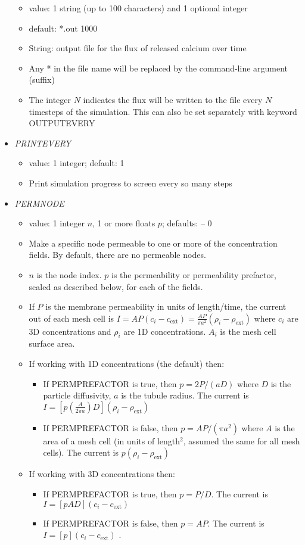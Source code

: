 \documentclass[12pt]{article}
\begin{document}
\begin{itemize}
\begin{itemize}
      \item  value: 1 string (up to 100 characters) and 1 optional integer
      \item  default: *.out 1000
      \item String: output file for the flux of released calcium over time      
      \item Any * in the file name will be replaced by the command-line argument (suffix)
      \item The integer $N$ indicates the flux will be written to the file every $N$ timesteps of the simulation. This can also be set separately with keyword OUTPUTEVERY
      \end{itemize}
%
\item {\it PRINTEVERY}
\begin{itemize}
	\item  value: 1 integer; default: 1
	\item Print simulation progress to screen every so many steps
\end{itemize}
%
\item {\it PERMNODE}
\begin{itemize}
	\item  value: 1 integer $n$, 1 or more floats $p$; defaults: -- 0
	\item Make a specific node permeable to one or more of the concentration fields. By default, there are no permeable nodes.	
	\item $n$ is the node index. $p$ is the permeability or permeability prefactor, scaled as described below, for each of the fields.
	\item If $P$ is the membrane permeability in units of length/time, the current out of each mesh cell is $I = AP (c_i - c_\text{ext}) = \frac{AP}{\pi a^2} (\rho_i - \rho_\text{ext})$ where $c_i$ are 3D concentrations and $\rho_i$ are 1D concentrations. $A_i$ is the mesh cell surface area.
	\item If working with 1D concentrations (the default) then:
	\begin{itemize}
	\item If PERMPREFACTOR is true, then $p = 2P/(aD)$ where $D$ is the particle diffusivity, $a$ is the tubule radius. The current is $I = [p (\frac{A}{2\pi a}) D](\rho_i - \rho_\text{ext})$ 
	\item If PERMPREFACTOR is false, then $p = A P/(\pi a^2)$ where $A$ is the area of a mesh cell (in units of length$^2$, assumed the same for all mesh cells). The current is $p(\rho_i - \rho_\text{ext})$
	\end{itemize}
	\item If working with 3D concentrations then:
	\begin{itemize}
		\item If PERMPREFACTOR is true, then $p = P/D$. The current is $I = [p A D](c_i - c_\text{ext})$ 
		\item If PERMPREFACTOR is false, then $p = A P$. The current is $I = [p](c_i - c_\text{ext})$  .		
	\end{itemize}
	

\end{itemize}
\end{itemize}
\end{document}
